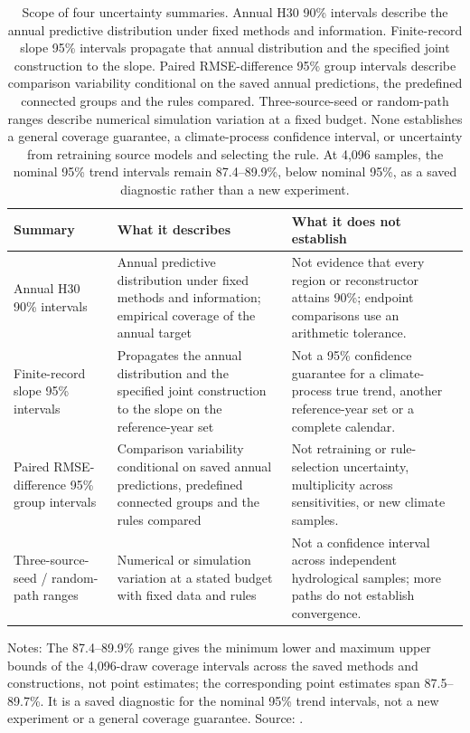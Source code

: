 \begin{table}[p]
\centering
\footnotesize
\caption{Scope of four uncertainty summaries. Annual H30 90\% intervals describe the annual predictive distribution under fixed methods and information. Finite-record slope 95\% intervals propagate that annual distribution and the specified joint construction to the slope. Paired RMSE-difference 95\% group intervals describe comparison variability conditional on the saved annual predictions, the predefined connected groups and the rules compared. Three-source-seed or random-path ranges describe numerical simulation variation at a fixed budget. None establishes a general coverage guarantee, a climate-process confidence interval, or uncertainty from retraining source models and selecting the rule. At 4,096 samples, the nominal 95\% trend intervals remain 87.4--89.9\%, below nominal 95\%, as a saved diagnostic rather than a new experiment.}
\label{tab:S4}
\setlength{\tabcolsep}{4pt}
\begin{tabular}{>{\raggedright\arraybackslash}p{}>{\raggedright\arraybackslash}p{}>{\raggedright\arraybackslash}p{}}
\toprule
Summary & What it describes & What it does not establish \\
\midrule
Annual H30 90\% intervals & Annual predictive distribution under fixed methods and information; empirical coverage of the annual target & Not evidence that every region or reconstructor attains 90\%; endpoint comparisons use an arithmetic tolerance. \\
\addlinespace
Finite-record slope 95\% intervals & Propagates the annual distribution and the specified joint construction to the slope on the reference-year set & Not a 95\% confidence guarantee for a climate-process true trend, another reference-year set or a complete calendar. \\
\addlinespace
Paired RMSE-difference 95\% group intervals & Comparison variability conditional on saved annual predictions, predefined connected groups and the rules compared & Not retraining or rule-selection uncertainty, multiplicity across sensitivities, or new climate samples. \\
\addlinespace
Three-source-seed / random-path ranges & Numerical or simulation variation at a stated budget with fixed data and rules & Not a confidence interval across independent hydrological samples; more paths do not establish convergence. \\
\bottomrule
\end{tabular}
\par\smallskip\footnotesize Notes: The 87.4--89.9\% range gives the minimum lower and maximum upper bounds of the 4,096-draw coverage intervals across the saved methods and constructions, not point estimates; the corresponding point estimates span 87.5--89.7\%. It is a saved diagnostic for the nominal 95\% trend intervals, not a new experiment or a general coverage guarantee. Source: .
\end{table}
